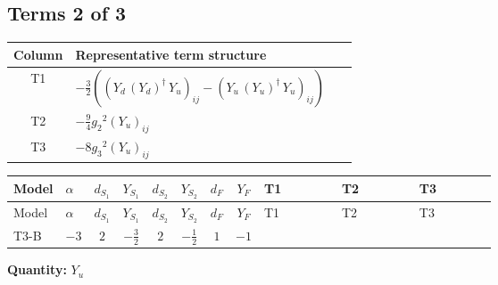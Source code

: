 \documentclass[8pt]{article}
\begin{document}
\begin{landscape}
\subsection*{Terms 2 of 3}
\begin{center}
\begin{tabular}{@{}c >{\raggedright\arraybackslash}p{0.82\linewidth}@{}}
\toprule
Column & Representative term structure \\
\midrule
T1 & \(\displaystyle -\frac{3}{2} (\left({Y_d}\,\left({Y_d}\right)^{\dagger}\,{Y_u}\right)_{ij}-\left({Y_u}\,\left({Y_u}\right)^{\dagger}\,{Y_u}\right)_{ij})\) \\
\midrule
T2 & \(\displaystyle -\frac{9}{4} {g_2}^2 \left({Y_u}\right)_{ij}\) \\
\midrule
T3 & \(\displaystyle -8 {g_3}^2 \left({Y_u}\right)_{ij}\) \\
\midrule
\bottomrule
\end{tabular}
\end{center}
\smallskip
\tiny
\begin{longtable}{@{}llcccccc >{\raggedright\arraybackslash}p{0.21\linewidth} >{\raggedright\arraybackslash}p{0.21\linewidth} >{\raggedright\arraybackslash}p{0.21\linewidth}@{}}
\toprule
Model & $\alpha$ & $d_{S_1}$ & $Y_{S_1}$ & $d_{S_2}$ & $Y_{S_2}$ & $d_F$ & $Y_F$ & T1 & T2 & T3 \\
\midrule
\endfirsthead
\toprule
Model & $\alpha$ & $d_{S_1}$ & $Y_{S_1}$ & $d_{S_2}$ & $Y_{S_2}$ & $d_F$ & $Y_F$ & T1 & T2 & T3 \\
\midrule
\endhead
T3-B & $-3$ & $2$ & $-\frac{3}{2}$ & $2$ & $-\frac{1}{2}$ & $1$ & $-1$ & \scriptsize\adjustbox{max width=\linewidth}{$\begin{gathered} -\frac{3}{2} (\left({Y_d}\,\left({Y_d}\right)^{\dagger}\,{Y_u}\right)_{ij}-\left({Y_u}\,\left({Y_u}\right)^{\dagger}\,{Y_u}\right)_{ij})\end{gathered}$} & \scriptsize\adjustbox{max width=\linewidth}{$\begin{gathered} -\frac{9}{4} {g_2}^2 \left({Y_u}\right)_{ij}\end{gathered}$} & \scriptsize\adjustbox{max width=\linewidth}{$\begin{gathered} -8 {g_3}^2 \left({Y_u}\right)_{ij}\end{gathered}$} \\
\midrule
\bottomrule
\end{longtable}
\clearpage
\noindent\textbf{Quantity: }$Y_u$\par\smallskip

\end{landscape}
\end{document}
